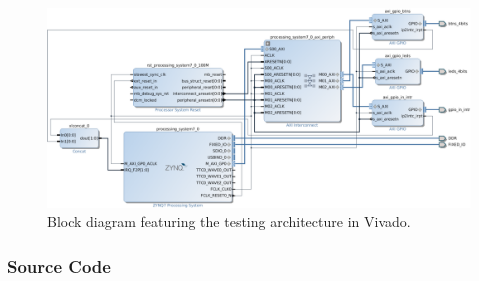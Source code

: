 \begin{figure}[h!]
	\centering
	\includegraphics[width = 0.9\linewidth]{graphics/Zybo_BasicTestingArchitecture_for_CAN}
	\caption{Block diagram featuring the testing architecture in Vivado.}
	\label{fig:CAN_Testing_Architecture}
\end{figure}

\subsubsection{Source Code}